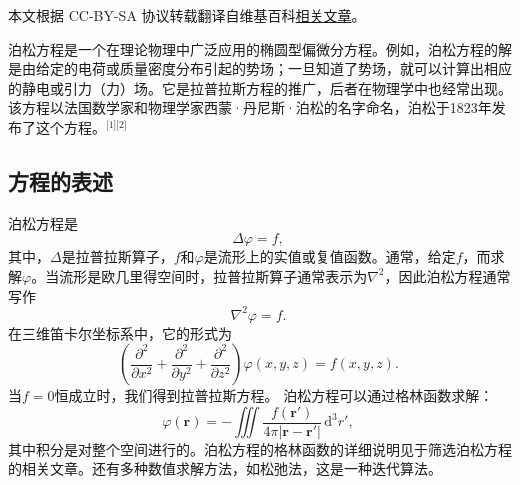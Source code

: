 
本文根据 CC-BY-SA 协议转载翻译自维基百科\href{https://en.wikipedia.org/wiki/Poisson\%27s_equation}{相关文章}。

泊松方程是一个在理论物理中广泛应用的椭圆型偏微分方程。例如，泊松方程的解是由给定的电荷或质量密度分布引起的势场；一旦知道了势场，就可以计算出相应的静电或引力（力）场。它是拉普拉斯方程的推广，后者在物理学中也经常出现。该方程以法国数学家和物理学家西蒙·丹尼斯·泊松的名字命名，泊松于1823年发布了这个方程。\(^\text{[1][2]}\)
\subsection{方程的表述}  
泊松方程是  
\[
\Delta \varphi = f,~
\]
其中，\(\Delta\)是拉普拉斯算子，\(f\)和\(\varphi\)是流形上的实值或复值函数。通常，给定\(f\)，而求解\(\varphi\)。当流形是欧几里得空间时，拉普拉斯算子通常表示为\(\nabla^2\)，因此泊松方程通常写作  
\[
\nabla^2 \varphi = f.~
\]
在三维笛卡尔坐标系中，它的形式为  
\[
\left( \frac{\partial^2}{\partial x^2} + \frac{\partial^2}{\partial y^2} + \frac{\partial^2}{\partial z^2} \right) \varphi (x, y, z) = f (x, y, z).~
\]
当\(f = 0\)恒成立时，我们得到拉普拉斯方程。
泊松方程可以通过格林函数求解：  
\[
\varphi(\mathbf{r}) = - \iiint \frac{f(\mathbf{r'})}{4 \pi |\mathbf{r} - \mathbf{r'}|} \, \mathrm{d}^3 r',~
\]
其中积分是对整个空间进行的。泊松方程的格林函数的详细说明见于筛选泊松方程的相关文章。还有多种数值求解方法，如松弛法，这是一种迭代算法。